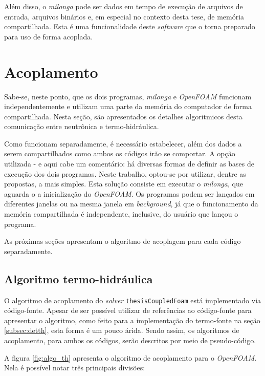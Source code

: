 Além disso, o \textit{milonga} pode ser dados em tempo de execução de arquivos de
entrada, arquivos binários e, em especial no contexto desta tese, de memória compartilhada.
Esta é uma funcionalidade deste \textit{software} que o torna preparado para uso de
forma acoplada.


\section{Acoplamento}
\label{sec:acoplamento}

Sabe-se, neste ponto, que os dois programas, \textit{milonga} e \textit{OpenFOAM} funcionam
independentemente e utilizam uma parte da memória do computador de forma compartilhada.
Nesta seção, são apresentados os detalhes algoritmicos desta comunicação entre neutrônica e
termo-hidráulica.

Como funcionam separadamente, é necessário estabelecer, além dos dados a serem compartilhados
como ambos os códigos irão se comportar. A opção utilizada - e aqui cabe um comentário: há diversas
formas de definir as bases de execução dos dois programas. Neste trabalho, optou-se por utilizar,
dentre as propostas, a mais simples. Esta solução consiste em executar o \textit{milonga}, que aguarda
o a inicialização do \textit{OpenFOAM}. Os programas podem ser lançados em diferentes janelas ou
na mesma janela em \textit{background}, já que o funcionamento da memória compartilhada é independente,
inclusive, do usuário que lançou o programa.

As próximas seções apresentam o algoritmo de acoplagem para cada código separadamente.


\subsection{Algoritmo termo-hidráulica}
\label{subsec:th}

O algoritmo de acoplamento do \textit{solver} \texttt{thesisCoupledFoam} está implementado
via código-fonte. Apesar de ser possível utilizar de referências ao código-fonte para
apresentar o algoritmo, como feito para a implementação do termo-fonte na seção \ref{subsec:detth},
esta forma é um pouco árida. Sendo assim, os algoritmos de acoplamento, para ambos os códigos,
serão descritos por meio de pseudo-código.

A figura \ref{fig:algo_th} apresenta o algoritmo de acoplamento para o \textit{OpenFOAM}. Nela é
possível notar três principais divisões:


